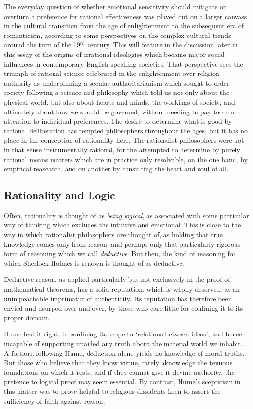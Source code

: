 \documentclass[10pt,titlepage]{article}
\begin{document}
The everyday question of whether emotional sensitivity should mitigate or overturn a preference for rational effectiveness was played out on a larger canvass in the cultural transition from the age of enlightenment to the subsequent era of romanticism, according to some perspectives on the complex cultural trends around the turn of the 19$^{th}$ century.
This will feature in the discussion later in this essay of the origins of irrational ideologies which became major social influences in contemporary English speaking societies.
That perspective sees the triumph of rational science celebrated in the enlightenment over religion authority as underpinning a secular authoritarianism which sought to order society following a science and philosophy which told us not only about the physical world, but also about hearts and minds, the workings of society, and ultimately about how we should be governed, without needing to pay too much attention to individual preferences.
The desire to determine what is good by rational deliberation has tempted philosophers throughout the ages, but it has no place in the conception of rationality here.
The rationalist philosophers were not in that sense instrumentally rational, for the attempted to determine by purely rational means matters which are in practice only resolvable, on the one hand, by empirical reasearch, and on another by consulting the heart and soul of all.

\subsection{Rationality and Logic}

Often, rationality is thought of as \emph{being logical}, as associated with some particular way of thinking which excludes the intuitive and emotional.
This is close to the way in which rationalist philosophers are thought of, as holding that true knowledge comes only from reason, and perhaps only that particularly rigorous form of reasoning which we call \emph{deductive}.
But then, the kind of reasoning for which Sherlock Holmes is renown is thought of as deductive.

Deductive reason, as applied particularly but not exclusively in the proof of mathematical theorems, has a solid reputation, which is wholly deserved, as an unimpeachable imprimatur of authenticity.
Its reputation has therefore been envied and usurped over and over, by those who care little for confining it to its proper domain.

Hume had it right, in confining its scope to `relations between ideas', and hence incapable of supporting unaided any truth about the material world we inhabit.
A fortiori, following Hume, deduction alone yields no knowledge of moral truths.
But those who believe that they know virtue, rarely aknowledge the tenuous foundations on which it rests, and if they cannot give it devine authority, the pretence to logical proof may seem essential.
By contrast, Hume's scepticism in this matter was to prove helpful to religious dissidents keen to assert the sufficiency of faith against reason.
\end{document}
